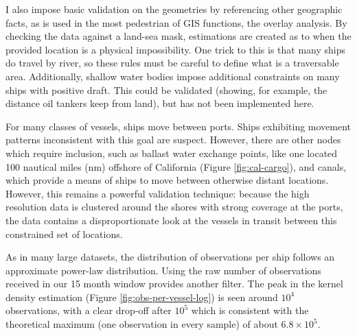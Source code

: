 I also impose basic validation on the geometries by referencing other geographic facts, as is used in the most pedestrian of GIS functions, the overlay analysis. By checking the data against a land-sea mask, estimations are created as to when the provided location is a physical impossibility. One trick to this is that many ships do travel by river, so these rules must be careful to define what is a traversable area. Additionally, shallow water bodies impose additional constraints on many ships with positive draft. This could be validated (showing, for example, the distance oil tankers keep from land), but has not been implemented here.

For many classes of vessels, ships move between ports. Ships exhibiting movement patterns inconsistent with this goal are suspect. %
However, there are other nodes which require inclusion, such as ballast water exchange points, like one located 100 nautical miles (nm) offshore of California (Figure \ref{fig:cal-cargo}), and canals, which provide a means of ships to move between otherwise distant locations. However, this remains a powerful validation technique: because the high resolution data is clustered around the shores with strong coverage at the ports, the data contains a disproportionate look at the vessels in transit between this constrained set of locations.

As in many large datasets, the distribution of observations per ship follows an approximate power-law distribution. Using the raw number of observations received in our 15 month window provides another filter. The peak in the kernel density estimation (Figure \ref{fig:obs-per-vessel-log}) is seen around $10^4$ observations, with a clear drop-off after $10^5$ which is consistent with the theoretical maximum (one observation in every sample) of about $6.8 \times 10^5$.

